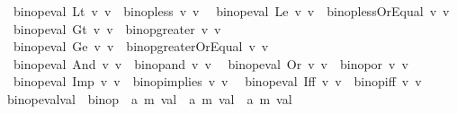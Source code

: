 \begin{isabellebody}
\ {\isacharbar}{\kern0pt}\ {\isachardoublequoteopen}binop{\isacharunderscore}{\kern0pt}eval\ Lt\ v{}\ v{}\ {\isacharequal}{\kern0pt}\ binop{\isacharunderscore}{\kern0pt}less\ v{}\ v{}{\isachardoublequoteclose}\isanewline
\ {\isacharbar}{\kern0pt}\ {\isachardoublequoteopen}binop{\isacharunderscore}{\kern0pt}eval\ Le\ v{}\ v{}\ {\isacharequal}{\kern0pt}\ binop{\isacharunderscore}{\kern0pt}lessOrEqual\ v{}\ v{}{\isachardoublequoteclose}\isanewline
\ {\isacharbar}{\kern0pt}\ {\isachardoublequoteopen}binop{\isacharunderscore}{\kern0pt}eval\ Gt\ v{}\ v{}\ {\isacharequal}{\kern0pt}\ binop{\isacharunderscore}{\kern0pt}greater\ v{}\ v{}{\isachardoublequoteclose}\isanewline
\ {\isacharbar}{\kern0pt}\ {\isachardoublequoteopen}binop{\isacharunderscore}{\kern0pt}eval\ Ge\ v{}\ v{}\ {\isacharequal}{\kern0pt}\ binop{\isacharunderscore}{\kern0pt}greaterOrEqual\ v{}\ v{}{\isachardoublequoteclose}\isanewline
\ {\isacharbar}{\kern0pt}\ {\isachardoublequoteopen}binop{\isacharunderscore}{\kern0pt}eval\ And\ v{}\ v{}\ {\isacharequal}{\kern0pt}\ binop{\isacharunderscore}{\kern0pt}and\ v{}\ v{}{\isachardoublequoteclose}\isanewline
\ {\isacharbar}{\kern0pt}\ {\isachardoublequoteopen}binop{\isacharunderscore}{\kern0pt}eval\ Or\ v{}\ v{}\ {\isacharequal}{\kern0pt}\ binop{\isacharunderscore}{\kern0pt}or\ v{}\ v{}{\isachardoublequoteclose}\isanewline
\ {\isacharbar}{\kern0pt}\ {\isachardoublequoteopen}binop{\isacharunderscore}{\kern0pt}eval\ Imp\ v{}\ v{}\ {\isacharequal}{\kern0pt}\ binop{\isacharunderscore}{\kern0pt}implies\ v{}\ v{}{\isachardoublequoteclose}\isanewline
\ {\isacharbar}{\kern0pt}\ {\isachardoublequoteopen}binop{\isacharunderscore}{\kern0pt}eval\ Iff\ v{}\ v{}\ {\isacharequal}{\kern0pt}\ binop{\isacharunderscore}{\kern0pt}iff\ v{}\ v{}{\isachardoublequoteclose}\isanewline
\isanewline
{}\isamarkupfalse%
\ binop{\isacharunderscore}{\kern0pt}eval{\isacharunderscore}{\kern0pt}val\ {\isacharcolon}{\kern0pt}{\isacharcolon}{\kern0pt}\ {\isachardoublequoteopen}binop\ {\isasymRightarrow}\ {\isacharparenleft}{\kern0pt}{\isacharprime}{\kern0pt}a{\isacharcomma}{\kern0pt}\ {\isacharprime}{\kern0pt}m{\isacharparenright}{\kern0pt}\ val\ {\isasymRightarrow}\ {\isacharparenleft}{\kern0pt}{\isacharprime}{\kern0pt}a{\isacharcomma}{\kern0pt}\ {\isacharprime}{\kern0pt}m{\isacharparenright}{\kern0pt}\ val\ {\isasymrightharpoonup}\ {\isacharparenleft}{\kern0pt}{\isacharprime}{\kern0pt}a{\isacharcomma}{\kern0pt}\ {\isacharprime}{\kern0pt}m{\isacharparenright}{\kern0pt}\ val{\isachardoublequoteclose}\isanewline

\end{isabellebody}
